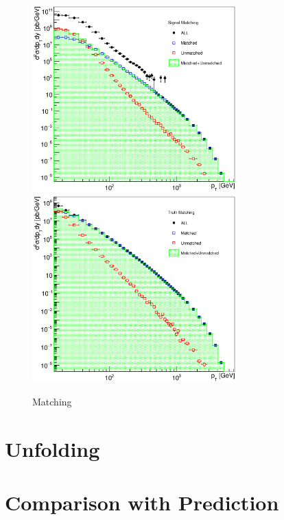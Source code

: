 \begin{figure}[p]
  \centering
  \includegraphics[width=0.7\textwidth]{Chapter3/SignalMatching.eps}
  \includegraphics[width=0.7\textwidth]{Chapter3/TruthMatching.eps}
  \caption{Matching}
  \label{fig:Matching}
\end{figure}

\section{Unfolding}

\section{Comparison with Prediction}





